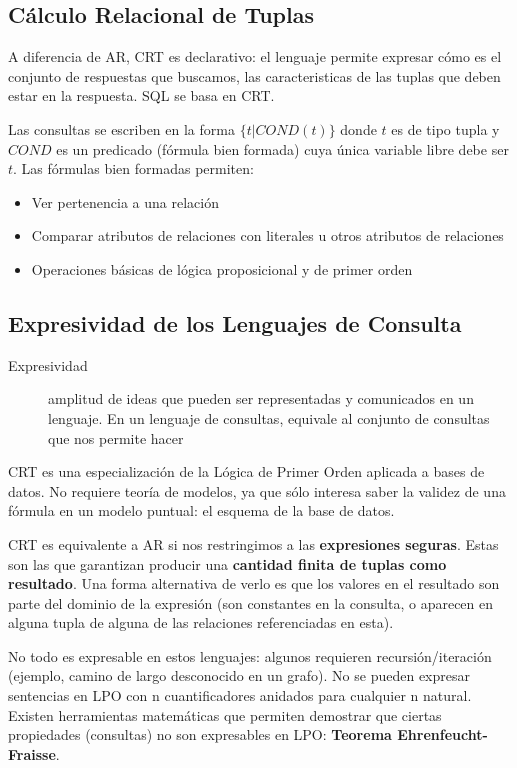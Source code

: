 \subsection{Cálculo Relacional de Tuplas}

A diferencia de AR, CRT es declarativo: el lenguaje permite expresar cómo es el conjunto de respuestas que
buscamos, las caracteristicas de las tuplas que deben estar en la respuesta. SQL se basa en CRT.

Las consultas se escriben en la forma $\{t | COND(t)\}$ donde $t$ es de tipo tupla y $COND$ es un predicado (fórmula bien formada) cuya única variable libre debe ser $t$. Las fórmulas bien formadas permiten:

\begin{itemize}
	\item Ver pertenencia a una relación
	\item Comparar atributos de relaciones con literales u otros atributos de relaciones
	\item Operaciones básicas de lógica proposicional y de primer orden
\end{itemize}

\subsection{Expresividad de los Lenguajes de Consulta}

\begin{description}
	\item[Expresividad] amplitud de ideas que pueden ser representadas y comunicados en un lenguaje. En un lenguaje de consultas, equivale al conjunto de consultas que nos permite hacer
\end{description}

CRT es una especialización de la Lógica de Primer Orden aplicada a bases de datos. No requiere teoría de modelos, ya que sólo interesa saber la validez de una fórmula en un modelo puntual: el esquema de la base de datos.

CRT es equivalente a AR si nos restringimos a las \textbf{expresiones seguras}. Estas son las que garantizan producir una \textbf{cantidad finita de tuplas como resultado}. Una forma alternativa de verlo es que los valores en el resultado son parte del dominio de la expresión (son constantes en la consulta, o aparecen en alguna tupla de alguna de las relaciones referenciadas en esta).

No todo es expresable en estos lenguajes: algunos requieren recursión/iteración (ejemplo, camino de largo desconocido en un grafo). No se pueden expresar sentencias en LPO con n cuantificadores anidados para cualquier n natural. Existen herramientas matemáticas que permiten demostrar
que ciertas propiedades (consultas) no son expresables en
LPO: \textbf{Teorema Ehrenfeucht-Fraisse}.

